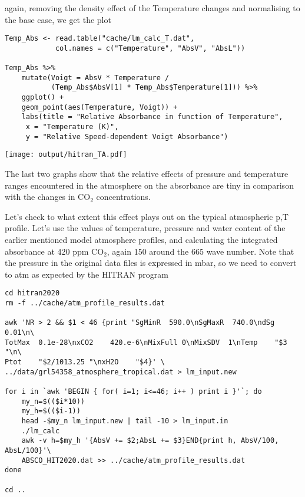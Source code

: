\documentclass[10pt,a4paper,titlepage]{article}
\begin{document}
again, removing the density effect of the Temperature changes and
normalising to the base case, we get the plot
\begin{lstlisting}
Temp_Abs <- read.table("cache/lm_calc_T.dat",
			col.names = c("Temperature", "AbsV", "AbsL"))

Temp_Abs %>%
    mutate(Voigt = AbsV * Temperature /
	       (Temp_Abs$AbsV[1] * Temp_Abs$Temperature[1])) %>%
    ggplot() +
    geom_point(aes(Temperature, Voigt)) +
    labs(title = "Relative Absorbance in function of Temperature",
	 x = "Temperature (K)",
	 y = "Relative Speed-dependent Voigt Absorbance")
\end{lstlisting}

\texttt{[image: output/hitran\_TA.pdf]}

The last two graphs show that the relative effects of pressure and
temperature ranges encountered in the atmosphere on the absorbance are
tiny in comparison with the changes in CO$_{\text{2}}$ concentrations.

Let's check to what extent this effect plays out on the typical
atmospheric p,T profile.  Let's use the values of temperature,
pressure and water content of the earlier mentioned model atmosphere
profiles, and calculating the integrated absorbance at 420 ppm CO$_{\text{2}}$,
again \unit{150}{\centi\reciprocal\metre} around the
\unit{665}{\centi\reciprocal\metre} wave number. Note that the
pressure in the original data files is expressed in mbar, so we need
to convert to atm as expected by the HITRAN program

\begin{lstlisting}
cd hitran2020
rm -f ../cache/atm_profile_results.dat

awk 'NR > 2 && $1 < 46 {print "SgMinR  590.0\nSgMaxR  740.0\ndSg     0.01\n\
TotMax  0.1e-28\nxCO2    420.e-6\nMixFull 0\nMixSDV  1\nTemp    "$3 "\n\
Ptot    "$2/1013.25 "\nxH2O    "$4}' \
../data/grl54358_atmosphere_tropical.dat > lm_input.new

for i in `awk 'BEGIN { for( i=1; i<=46; i++ ) print i }'`; do
    my_n=$(($i*10))
    my_h=$(($i-1))
    head -$my_n lm_input.new | tail -10 > lm_input.in
    ./lm_calc
    awk -v h=$my_h '{AbsV += $2;AbsL += $3}END{print h, AbsV/100, AbsL/100}'\
	ABSCO_HIT2020.dat >> ../cache/atm_profile_results.dat 
done

cd ..
\end{lstlisting}
\end{document}
